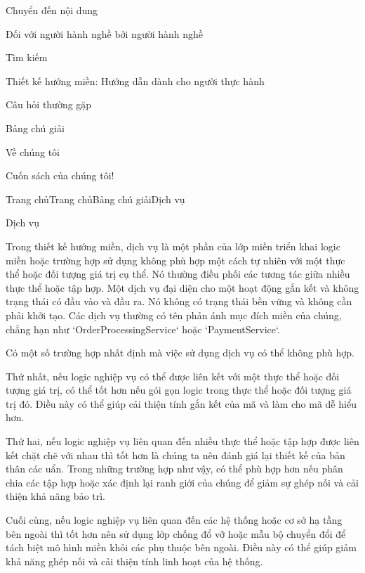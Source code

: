 


Chuyển đến nội dung

Đối với người hành nghề bởi người hành nghề

Tìm kiếm

Thiết kế hướng miền: Hướng dẫn dành cho người thực hành

Câu hỏi thường gặp

Bảng chú giải

Về chúng tôi

Cuốn sách của chúng tôi!

Trang chủTrang chủBảng chú giảiDịch vụ

Dịch vụ

Trong thiết kế hướng miền, dịch vụ là một phần của lớp miền triển khai logic miền hoặc trường hợp sử dụng không phù hợp một cách tự nhiên với một thực thể hoặc đối tượng giá trị cụ thể. Nó thường điều phối các tương tác giữa nhiều thực thể hoặc tập hợp. Một dịch vụ đại diện cho một hoạt động gắn kết và không trạng thái có đầu vào và đầu ra. Nó không có trạng thái bền vững và không cần phải khởi tạo. Các dịch vụ thường có tên phản ánh mục đích miền của chúng, chẳng hạn như `OrderProcessingService` hoặc `PaymentService`.

Có một số trường hợp nhất định mà việc sử dụng dịch vụ có thể không phù hợp.

Thứ nhất, nếu logic nghiệp vụ có thể được liên kết với một thực thể hoặc đối tượng giá trị, có thể tốt hơn nếu gói gọn logic trong thực thể hoặc đối tượng giá trị đó. Điều này có thể giúp cải thiện tính gắn kết của mã và làm cho mã dễ hiểu hơn.

Thứ hai, nếu logic nghiệp vụ liên quan đến nhiều thực thể hoặc tập hợp được liên kết chặt chẽ với nhau thì tốt hơn là chúng ta nên đánh giá lại thiết kế của bản thân các uẩn. Trong những trường hợp như vậy, có thể phù hợp hơn nếu phân chia các tập hợp hoặc xác định lại ranh giới của chúng để giảm sự ghép nối và cải thiện khả năng bảo trì.

Cuối cùng, nếu logic nghiệp vụ liên quan đến các hệ thống hoặc cơ sở hạ tầng bên ngoài thì tốt hơn nên sử dụng lớp chống đổ vỡ hoặc mẫu bộ chuyển đổi để tách biệt mô hình miền khỏi các phụ thuộc bên ngoài. Điều này có thể giúp giảm khả năng ghép nối và cải thiện tính linh hoạt của hệ thống.


